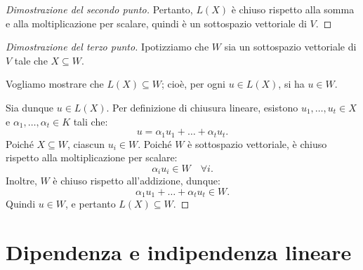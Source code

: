 {\begin{proof}[Dimostrazione del secondo punto]
        Pertanto, \( L(X) \) è chiuso rispetto alla somma e alla moltiplicazione per scalare, quindi è un sottospazio vettoriale di \( V \).
    \end{proof}

    \begin{proof}[Dimostrazione del terzo punto]
        Ipotizziamo che \( W \) sia un sottospazio vettoriale di \( V \) tale che \( X \subseteq W \).

        Vogliamo mostrare che \( L(X) \subseteq W \); cioè, per ogni \( u \in L(X) \), si ha \( u \in W \).

        Sia dunque \( u \in L(X) \). Per definizione di chiusura lineare, esistono \( u_1, \dots, u_t \in X \) e \( \alpha_1, \dots, \alpha_t \in K \) tali che:
        \[
        u = \alpha_1 u_1 + \dots + \alpha_t u_t.
        \]
        Poiché \( X \subseteq W \), ciascun \( u_i \in W \).  
        Poiché \( W \) è sottospazio vettoriale, è chiuso rispetto alla moltiplicazione per scalare:
        \[
        \alpha_i u_i \in W \quad \forall i.
        \]
        Inoltre, \( W \) è chiuso rispetto all’addizione, dunque:
        \[
        \alpha_1 u_1 + \dots + \alpha_t u_t \in W.
        \]
        Quindi \( u \in W \), e pertanto \( L(X) \subseteq W \).
    \end{proof}
}

\section{Dipendenza e indipendenza lineare}



